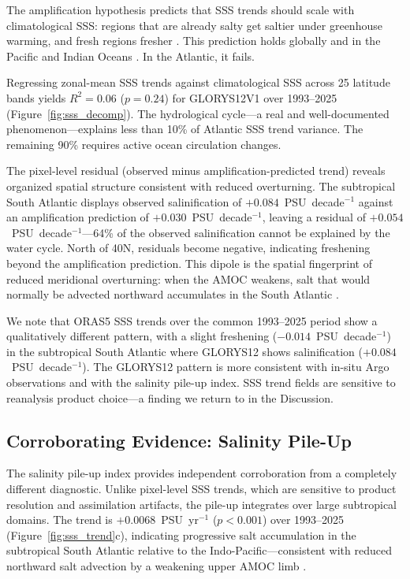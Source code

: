 \documentclass{agujournal2019}
\begin{document}
The amplification hypothesis predicts that SSS trends should scale with climatological SSS: regions that are already salty get saltier under greenhouse warming, and fresh regions fresher \cite{Held2006}. This prediction holds globally and in the Pacific and Indian Oceans \cite{Durack2012}. In the Atlantic, it fails.

Regressing zonal-mean SSS trends against climatological SSS across 25 latitude bands yields $R^2 = 0.06$ ($p = 0.24$) for GLORYS12V1 over 1993--2025 (Figure~\ref{fig:sss_decomp}). The hydrological cycle---a real and well-documented phenomenon---explains less than 10\% of Atlantic SSS trend variance. The remaining 90\% requires active ocean circulation changes.

The pixel-level residual (observed minus amplification-predicted trend) reveals organized spatial structure consistent with reduced overturning. The subtropical South Atlantic displays observed salinification of $+0.084$~PSU~decade$^{-1}$ against an amplification prediction of $+0.030$~PSU~decade$^{-1}$, leaving a residual of $+0.054$~PSU~decade$^{-1}$---64\% of the observed salinification cannot be explained by the water cycle. North of 40\textdegree N, residuals become negative, indicating freshening beyond the amplification prediction. This dipole is the spatial fingerprint of reduced meridional overturning: when the AMOC weakens, salt that would normally be advected northward accumulates in the South Atlantic \cite{Zhu2020}.

We note that ORAS5 SSS trends over the common 1993--2025 period show a qualitatively different pattern, with a slight freshening ($-0.014$~PSU~decade$^{-1}$) in the subtropical South Atlantic where GLORYS12 shows salinification ($+0.084$~PSU~decade$^{-1}$). The GLORYS12 pattern is more consistent with in-situ Argo observations and with the salinity pile-up index. SSS trend fields are sensitive to reanalysis product choice---a finding we return to in the Discussion.

\subsection{Corroborating Evidence: Salinity Pile-Up}

The salinity pile-up index provides independent corroboration from a completely different diagnostic. Unlike pixel-level SSS trends, which are sensitive to product resolution and assimilation artifacts, the pile-up integrates over large subtropical domains. The trend is $+0.0068$~PSU~yr$^{-1}$ ($p < 0.001$) over 1993--2025 (Figure~\ref{fig:sss_trend}c), indicating progressive salt accumulation in the subtropical South Atlantic relative to the Indo-Pacific---consistent with reduced northward salt advection by a weakening upper AMOC limb \cite{Zhu2020}.
\end{document}
